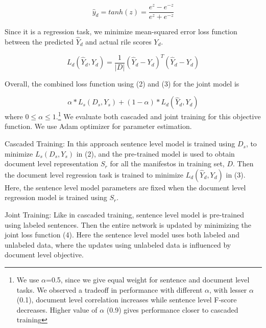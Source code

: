 \documentclass[11pt,a4paper]{article}
\begin{document}
\[ \hat{y}_{d} = tanh(z) = \frac{e^z - e^{-z}}{e^z + e^{-z}} \]

Since it is a regression task, we minimize mean-squared error loss function between the predicted $\hat{Y}_{d}$ and actual rile scores $Y_{d}$.

\begin{equation}
L_{d}(\hat{Y}_{d}, Y_{d}) = \frac{1}{|D|}  (\hat{Y}_{d} - Y_{d})^T (\hat{Y}_{d} - Y_{d})
\end{equation}

Overall, the combined loss function using (2) and (3) for the joint model is 

\begin{equation}
 \alpha * L_{s}(D_{s},Y_{s}) + (1-\alpha) * L_{d}(\hat{Y}_{d}, Y_{d})
\end{equation}
where $0 \le \alpha \le 1$.\footnote{We use  $\alpha$=0.5, since we give equal weight for sentence and document level tasks. We observed a tradeoff in performance with different $\alpha$, with lesser $\alpha$ (0.1), document level correlation increases while sentence level F-score decreases. Higher value of $\alpha$ (0.9) gives performance closer to cascaded training}
We evaluate both cascaded and joint training for this objective function. We use Adam optimizer \cite{DBLP:journals/corr/KingmaB14} for parameter estimation. 
\begin{description}
\item{Cascaded Training:} In this approach sentence level model is trained using $D_{s}$, to minimize $L_{s}(D_{s},Y_{s})$ in (2), and the pre-trained model is used to obtain document level representation $S_{r}$ for all the manifestos in training set, $D$. Then the document level regression task is trained to minimize $L_{d}(\hat{Y}_{d}, Y_{d})$ in (3). Here, the sentence level model parameters are fixed when the document level regression model is trained using $S_{r}$.

\item{Joint Training:} Like in cascaded training, sentence level model is pre-trained using labeled sentences. Then the entire network is updated by minimizing the joint loss function (4). Here the sentence level model uses both labeled and unlabeled data, where the updates using unlabeled data is influenced by document level objective.
\end{description}
\end{document}
